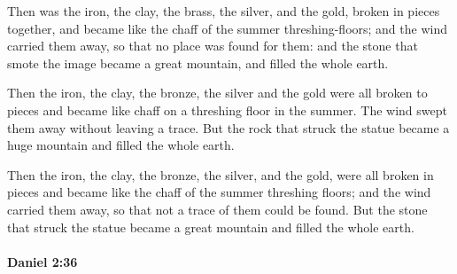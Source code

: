 			\begin{versebox}
					\item[BHS] 
					\item[LXX] 
					\item[ASV] Then was the iron, the clay, the brass, the silver, and the gold, broken in pieces together, and became like the chaff of the summer threshing-floors; and the wind carried them away, so that no place was found for them: and the stone that smote the image became a great mountain, and filled the whole earth.
					\item[NIV] Then the iron, the clay, the bronze, the silver and the gold were all broken to pieces and became like chaff on a threshing floor in the summer. The wind swept them away without leaving a trace. But the rock that struck the statue became a huge mountain and filled the whole earth.
					\item[NRSV] Then the iron, the clay, the bronze, the silver, and the gold, were all broken in pieces and became like the chaff of the summer threshing floors; and the wind carried them away, so that not a trace of them could be found. But the stone that struck the statue became a great mountain and filled the whole earth.
			\end{versebox}

		\paragraph{Daniel 2:36} %
			\label{DANIEL-2-36}

